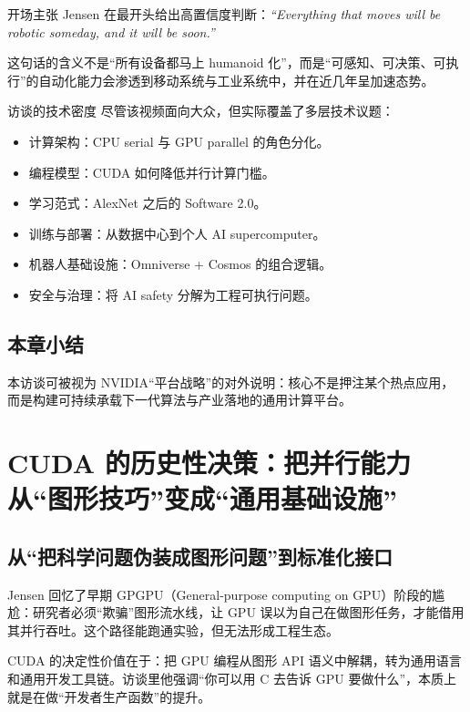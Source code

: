 \documentclass[a4paper]{article}
\begin{document}
\begin{importantbox}{开场主张}
Jensen 在最开头给出高置信度判断：\textit{``Everything that moves will be robotic someday, and it will be soon.''}

这句话的含义不是“所有设备都马上 humanoid 化”，而是“可感知、可决策、可执行”的自动化能力会渗透到移动系统与工业系统中，并在近几年呈加速态势。
\end{importantbox}

\begin{knowledgebox}{访谈的技术密度}
尽管该视频面向大众，但实际覆盖了多层技术议题：
\begin{itemize}
    \item 计算架构：CPU serial 与 GPU parallel 的角色分化。
    \item 编程模型：CUDA 如何降低并行计算门槛。
    \item 学习范式：AlexNet 之后的 Software 2.0。
    \item 训练与部署：从数据中心到个人 AI supercomputer。
    \item 机器人基础设施：Omniverse + Cosmos 的组合逻辑。
    \item 安全与治理：将 AI safety 分解为工程可执行问题。
\end{itemize}
\end{knowledgebox}

\subsection{本章小结}
本访谈可被视为 NVIDIA“平台战略”的对外说明：核心不是押注某个热点应用，而是构建可持续承载下一代算法与产业落地的通用计算平台。

\section{CUDA 的历史性决策：把并行能力从“图形技巧”变成“通用基础设施”}

\subsection{从“把科学问题伪装成图形问题”到标准化接口}

Jensen 回忆了早期 GPGPU（General-purpose computing on GPU）阶段的尴尬：研究者必须“欺骗”图形流水线，让 GPU 误以为自己在做图形任务，才能借用其并行吞吐。这个路径能跑通实验，但无法形成工程生态。

CUDA 的决定性价值在于：把 GPU 编程从图形 API 语义中解耦，转为通用语言和通用开发工具链。访谈里他强调“你可以用 C 去告诉 GPU 要做什么”，本质上就是在做“开发者生产函数”的提升。
\end{document}
